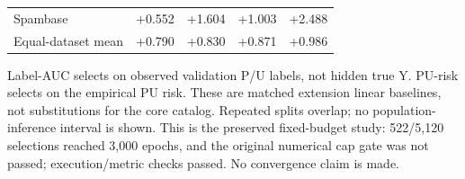 \begin{table}[t]
\begin{tabularx}{\textwidth}{>{\raggedright\arraybackslash}Xrrrr}
Spambase & +0.552 & +1.604 & +1.003 & +2.488 \\
Equal-dataset mean & +0.790 & +0.830 & +0.871 & +0.986 \\
\bottomrule
\end{tabularx}
\par\medskip
\begin{minipage}{\textwidth}\small
Label-AUC selects on observed validation P/U labels, not hidden true Y. PU-risk selects on the empirical PU risk. These are matched extension linear baselines, not substitutions for the core catalog. Repeated splits overlap; no population-inference interval is shown. This is the preserved fixed-budget study: 522/5,120 selections reached 3,000 epochs, and the original numerical cap gate was not passed; execution/metric checks passed. No convergence claim is made.
\end{minipage}
\end{table}
